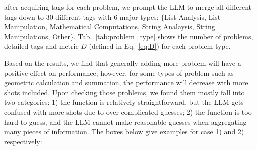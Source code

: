 after acquiring tags for each problem, we prompt the LLM to merge all different tags down to $30$ different tags with $6$ major types: $\{$List Analysis, List Manipulation, Mathematical Computations, String Analaysis, String Manipulations, Other$\}$. Tab.~\ref{tab:problem_type} shows the number of problems, detailed tags and metric $D$ (defined in Eq.~\eqref{eq:D}) for each problem type. 

Based on the results, we find that generally adding more problem will have a positive effect on performance; however, for some types of problem such as geometric calculation and summation, the performance will decrease with more shots included. Upon checking those problems, we found them mostly fall into two categories: 1) the function is relatively straightforward, but the LLM gets confused with more shots due to over-complicated guesses; 2) the function is too hard to guess, and the LLM cannot make reasonable guesses when aggregating many pieces of information. The boxes below give examples for case 1) and 2) respectively:


{
\setlength{\fboxsep}{0.3cm}
}

